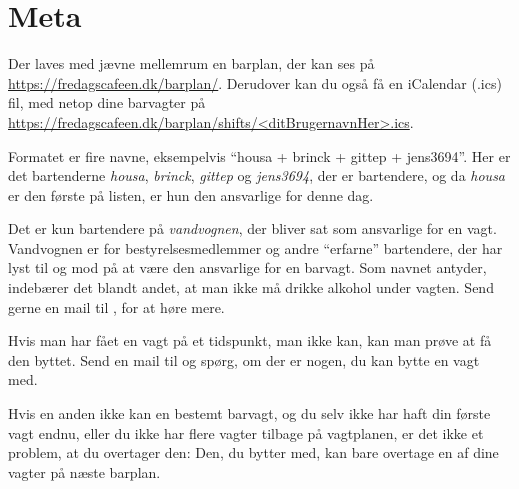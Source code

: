 \section{Meta}
\label{sec:meta}

Der laves med jævne mellemrum en barplan, der kan ses på
\url{https://fredagscafeen.dk/barplan/}. Derudover kan du også få en
iCalendar (.ics) fil, med netop dine barvagter på
\url{https://fredagscafeen.dk/barplan/shifts/<ditBrugernavnHer>.ics}.

Formatet er fire navne, eksempelvis ``housa + brinck +
gittep + jens3694''. Her er det bartenderne \emph{housa},
\emph{brinck}, \emph{gittep} og \emph{jens3694}, der er bartendere, og
da \emph{housa} er den første på listen, er hun den ansvarlige for
denne dag.

Det er kun bartendere på \emph{vandvognen}, der bliver sat som
ansvarlige for en vagt. Vandvognen er for bestyrelsesmedlemmer
og andre ``erfarne'' bartendere, der har lyst til og mod på at være
den ansvarlige for en barvagt. Som navnet antyder, indebærer det
blandt andet, at man ikke må drikke alkohol under vagten. Send gerne
en mail til \bestmail, for at høre mere.

Hvis man har fået en vagt på et tidspunkt, man ikke kan, kan man prøve
at få den byttet. Send en mail til \allemail og
spørg, om der er nogen, du kan bytte en vagt med.

Hvis en anden ikke kan en bestemt barvagt, og du selv ikke har haft
din første vagt endnu, eller du ikke har flere vagter tilbage på
vagtplanen, er det ikke et problem, at du overtager den: Den, du
bytter med, kan bare overtage en af dine vagter på næste barplan.
